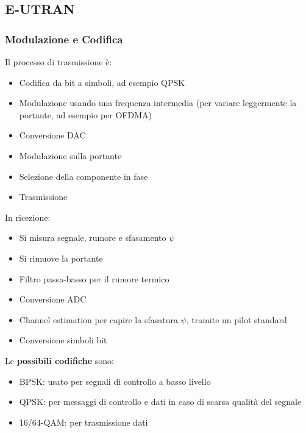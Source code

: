 \subsection{E-UTRAN}

\subsubsection{Modulazione e Codifica}

Il processo di trasmissione è: 
\begin{itemize}
    \item Codifica da bit a simboli, ad esempio QPSK 
    
    \item Modulazione usando una frequenza intermedia (per variare leggermente la portante, ad esempio per OFDMA)
    
    \item Conversione DAC
    
    \item Modulazione sulla portante
    
    \item Selezione della componente in fase 
    
    \item Trasmissione
\end{itemize}

In ricezione: 
\begin{itemize}
    \item Si misura segnale, rumore e sfasamento $\psi$
    
    \item Si rimuove la portante
    
    \item Filtro passa-basso per il rumore termico
    
    \item Conversione ADC
    
    \item Channel estimation per capire la sfasatura $\psi$, tramite un pilot standard
    
    \item Conversione simboli bit
\end{itemize}

Le \textbf{possibili codifiche} sono:
\begin{itemize}
    \item BPSK: usato per segnali di controllo a basso livello
    
    \item QPSK: per messaggi di controllo e dati in caso di scarsa qualità del segnale
    
    \item 16/64-QAM: per trasmissione dati
\end{itemize}

